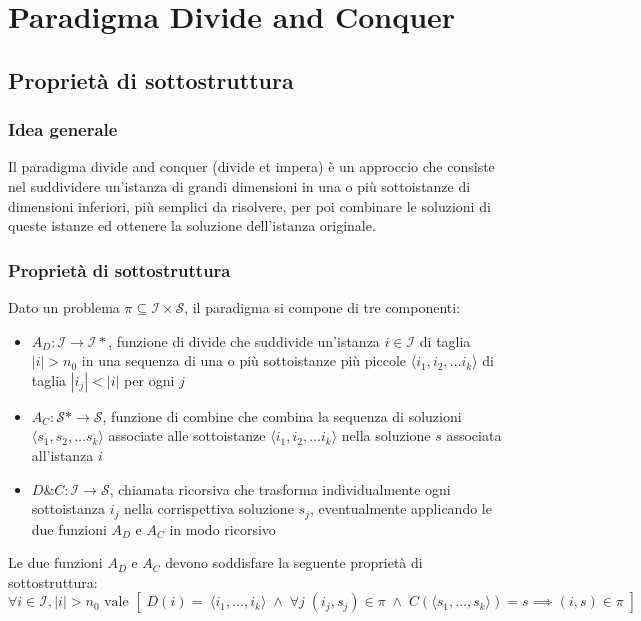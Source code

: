 \section{Paradigma Divide and Conquer}
\subsection{Proprietà di sottostruttura}
\subsubsection*{Idea generale}
Il paradigma divide and conquer (divide et impera) è un approccio che consiste nel suddividere un'istanza di grandi dimensioni
in una o più sottoistanze di dimensioni inferiori, più semplici da risolvere, per poi combinare le soluzioni di queste istanze ed
ottenere la soluzione dell'istanza originale.

\subsubsection*{Proprietà di sottostruttura}
Dato un problema \(\pi \subseteq \mathcal{I} \times \mathcal{S}\), il paradigma si compone di tre componenti:
\begin{itemize}[topsep=5pt, itemsep=3pt] 
	\item \(A_D : \mathcal{I} \to \mathcal{I}*\), funzione di divide che suddivide un'istanza \(i \in \mathcal{I}\) di
	taglia \(|i| > n_0\) in una sequenza di una o più sottoistanze più piccole \(\langle i_1, i_2, \dots i_k \rangle\)
	di taglia \(|i_j| < |i|\) per ogni \(j\)
	\item \(A_C : \mathcal{S}* \to \mathcal{S}\), funzione di combine che combina la sequenza di soluzioni
	\(\langle s_1, s_2, \dots s_k \rangle\) associate alle sottoistanze \(\langle i_1, i_2, \dots i_k \rangle\)
	nella soluzione \(s\) associata all'istanza \(i\)
	\item \(D\&C : \mathcal{I} \to \mathcal{S}\), chiamata ricorsiva che trasforma individualmente ogni sottoistanza \(i_j\)
	nella corrispettiva soluzione \(s_j\), eventualmente applicando le due funzioni \(A_D\) e \(A_C\) in modo ricorsivo
\end{itemize}

\noindent
Le due funzioni \(A_D\) e \(A_C\) devono soddisfare la seguente proprietà di sottostruttura:
\[\forall i \in \mathcal{I}, |i| > n_0 \text{ vale } \left[ \; D(i) = \; \langle i_1, \dots, i_k \rangle \; \wedge \; \forall j \; (i_j, s_j) \in \pi \; \wedge \; C(\langle s_1, \dots, s_k \rangle) = s \implies (i, s) \in \pi \; \right]\]

